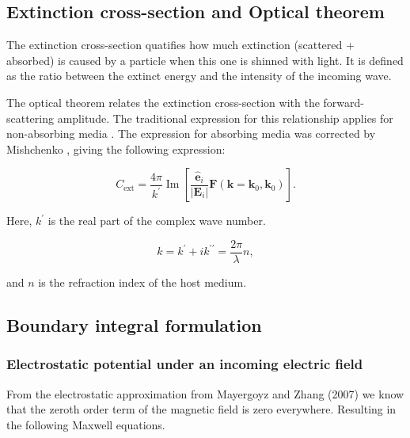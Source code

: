 \subsection{Extinction cross-section and Optical theorem} \label{sec:cext_ot}

The extinction cross-section quatifies how much extinction (scattered + absorbed) 
is caused by a particle when this one is shinned with light. It is defined as the
ratio between the extinct energy and the intensity of the incoming wave. 

The optical theorem relates the extinction cross-section with the forward-scattering amplitude. The traditional expression for this relationship applies for non-absorbing media \cite{MayergoyzZhang2007, Jackson}. The expression for absorbing media \cite{BohrenGilra1979, VideenSun2003} was corrected by Mishchenko \cite{Mishchenko2007}, giving the following expression:

\begin{equation} \label{eq:cext_fwa}
    C_\text{ext} = \frac{4\pi}{k^\prime} \operatorname{Im} \left[ \frac{\mathbf{\hat{e}}_i}{|\mathbf{E}_i|}\mathbf{F}(\mathbf{k}=\mathbf{k}_0, \mathbf{k}_0) \right].
\end{equation}


{\color{red}{Chris in Mishenko 2007 paper the equation is not exactly the same 
(look eq 87 in paper), do you have that derivation? How you got to the eq 7.22 
 in your thesis?.}}


Here, $k^\prime$ is the real part of the complex wave number. 

\begin{equation}
    k = k^\prime + ik^{\prime\prime} = \frac{2\pi}{\lambda} n,
\end{equation}

and $n$ is the refraction index of the host medium.


\subsection{Boundary integral formulation} \label{sec:lspr_bem}

\subsubsection{Electrostatic potential under an incoming electric field}

From the electrostatic approximation from Mayergoyz and Zhang (2007) 
\cite{MayergoyzZhang2007} we know that the zeroth order term of the magnetic 
field is zero everywhere. Resulting in the following Maxwell equations. 

